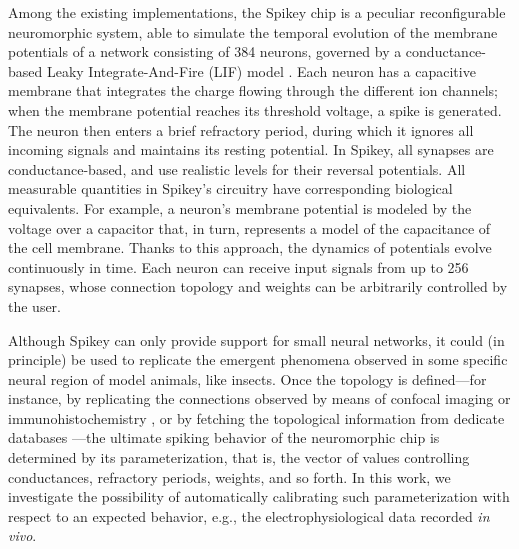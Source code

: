 \documentclass[utf8]{frontiersFPHY} %
\begin{document}
Among the existing implementations, the Spikey chip \cite{Pfeil2013} is a peculiar reconfigurable neuromorphic system, able to simulate the temporal evolution of the membrane potentials of a network consisting of 384 neurons, governed by a conductance-based Leaky Integrate-And-Fire (LIF) model  \cite{}.
Each neuron has a capacitive membrane that integrates the charge flowing through the different ion channels; when the membrane potential reaches its threshold voltage, a spike is generated.  
The neuron then enters a brief refractory period, during which it ignores all incoming signals and maintains its resting potential.
In Spikey, all synapses are conductance-based, and use realistic levels for their reversal potentials. 
All measurable quantities in Spikey's circuitry have corresponding biological equivalents. 
For example, a neuron's membrane potential is modeled by the voltage over a capacitor that, in turn, represents a model of the capacitance of the cell membrane.
Thanks to this approach, the dynamics of potentials evolve continuously in time. 
Each neuron can receive input signals from up to 256 synapses, whose connection topology and weights can be arbitrarily controlled by the user.

Although Spikey can only provide support for small neural networks, it could (in principle) be used to replicate the emergent phenomena observed in some specific neural region of model animals, like insects. 
Once the topology is defined---for instance, by replicating the connections observed by means of confocal imaging \cite{mishima1999physiological} or immunohistochemistry \cite{nishikawa2008neural}, or by fetching the topological information from dedicate databases \cite{kazawa2008development}---the ultimate spiking behavior of the neuromorphic chip is determined by its parameterization, that is, the vector of values controlling conductances, refractory periods, weights, and so forth. 
In this work, we investigate the possibility of automatically calibrating such parameterization with respect to an expected behavior, e.g., the electrophysiological data recorded \emph{in vivo}.
\end{document}
